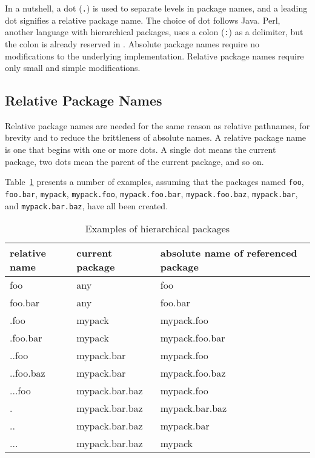 In a nutshell, a dot (\verb|.|) is used to separate levels in package
names, and a leading dot signifies a relative package name. The choice
of dot follows Java. Perl, another language with hierarchical
packages, uses a colon (\verb|:|) as a delimiter, but the colon is
already reserved in \clisp{}. Absolute package names require no
modifications to the underlying \clisp{} implementation. Relative
package names require only small and simple modifications.


\subsection{Relative Package Names}

Relative package names are needed for the same reason as relative
pathnames, for brevity and to reduce the brittleness of absolute
names. A relative package name is one that begins with one or more
dots. A single dot means the current package, two dots mean the parent
of the current package, and so on.

Table~\ref{tbl:hierarchical-packages} presents a number of examples,
assuming that the packages named \verb|foo|, \verb|foo.bar|,
\verb|mypack|, \verb|mypack.foo|, \verb|mypack.foo.bar|,
\verb|mypack.foo.baz|, \verb|mypack.bar|, and \verb|mypack.bar.baz|,
have all been created.

\begin{table}[h]
\begin{center}
\begin{tabular}{|l|l|l|}
\hline
relative name   &  current package & absolute name of referenced package \\
\hline
foo &               any  &                      foo \\
foo.bar &           any &                       foo.bar \\
.foo &              mypack &                    mypack.foo \\
 .foo.bar &         mypack &                    mypack.foo.bar \\
 ..foo &            mypack.bar &                mypack.foo \\
 ..foo.baz &        mypack.bar &                mypack.foo.baz \\
 ...foo &           mypack.bar.baz &            mypack.foo \\
 . &                mypack.bar.baz &            mypack.bar.baz \\
 .. &               mypack.bar.baz &            mypack.bar \\
 ... &              mypack.bar.baz &            mypack \\
\hline
\end{tabular}
\end{center}
\caption{Examples of hierarchical packages}
\label{tbl:hierarchical-packages}
\end{table}

